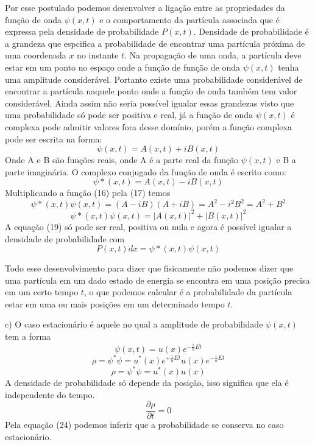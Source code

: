 \documentclass{article}
\begin{document}
Por esse postulado podemos desenvolver a  ligação entre as propriedades da função de onda $\psi(x,t)$ e o comportamento da partícula associada que é expressa pela densidade de probabilidade $P(x,t)$. Densidade de probabilidade é a grandeza que espcifica a probabilidade de encontrar uma partícula próxima de uma coordenada $x$ no instante $t$. 
\hfill \break
Na propagação de uma onda, a partícula deve estar em um ponto no espaço onde a função de função de onda $\psi(x,t)$ tenha uma amplitude considerável. Portanto existe uma probabilidade  considerável de encontrar a partícula naquele ponto onde a função de onda também tem valor considerável. Ainda assim não seria possível igualar essas grandezas visto que uma probabilidade só pode ser positiva e real, já a função de onda $\psi(x,t)$ é complexa pode admitir valores fora desse domínio, porém a função complexa pode ser escrita na forma: 
\begin{equation}
    {\psi(x,t) = A(x,t) +iB(x,t)}
\end{equation}
Onde A e B são funções reais, onde A é a parte real da função $\psi(x,t)$ e B a parte imaginária. O complexo conjugado da função de onda é escrito como:
\begin{equation}
    {\psi*(x,t) = A(x,t) - iB(x,t)}
\end{equation}
Multiplicando a função (16) pela (17) temos
\begin{equation}
    {\psi*(x,t)\psi(x,t) = (A - iB)(A+iB) = A^{2} -i^{2}B^{2}= A^{2} + B^{2}}
\end{equation}
\begin{equation}
    {\psi*(x,t)\psi(x,t)=|A(x,t)|^{2} + |B(x,t)|^{2}}
\end{equation}
A equação (19) só pode ser real, positiva ou nula e agora é possível igualar a densidade de probabilidade com 
\begin{equation}
    {P(x,t)dx = \psi*(x,t)\psi(x,t)}
\end{equation}

Todo esse desenvolvimento para dizer que fisicamente não podemos dizer que uma partícula em um dado estado de energia se encontra em uma posição precisa em um certo tempo $t$, o que podemos calcular é a probabilidade da partícula estar em uma ou mais posições em um determinado tempo $t$.

c) O caso estacionário é aquele no qual a amplitude de probabilidade $\psi(x,t)$ tem a forma
\begin{equation}
    {\psi(x,t) = u(x)e^{-\frac{i}{\hbar}Et}}
\end{equation}
\begin{equation}
    {\rho = \psi^{*}\psi = u^{*}(x)e^{+\frac{i}{\hbar}Et}u(x)e^{-\frac{i}{\hbar}Et}}
\end{equation}
\begin{equation}
    {\rho = \psi^{*}\psi = u^{*}(x)u(x)}
\end{equation}
A densidade de probabilidade só depende da posição, isso significa que ela é independente do tempo.
\begin{equation}
    {\frac{\partial \rho}{\partial t} = 0}
\end{equation}
Pela equação (24) podemos inferir que a probabilidade se conserva no caso estacionário. 
\end{document}
